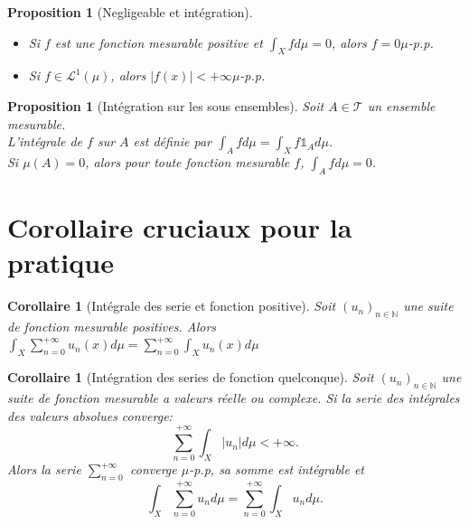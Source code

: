 \documentclass[a4paper,12pt,french]{report}
\theoremstyle{break}
\newtheorem{prop}[defin]{Proposition}
\newtheorem{coro}[defin]{Corollaire}
\begin{document}
\begin{prop}[Negligeable et intégration]
       \begin{itemize}
              \item Si $f$ est une fonction mesurable positive et $\int_{X} f d\mu = 0$, alors $f=0 \mu$-p.p.
              \item Si $f \in \mathcal{L}^{1}(\mu)$, alors $|f(x)| < +\infty \mu$-p.p.
       \end{itemize}
\end{prop}

\begin{prop}[Intégration sur les sous ensembles]
       Soit $A \in \mathcal{T}$ un ensemble mesurable.\\ L'intégrale de $f$ sur $A$ est définie par $\displaystyle \int_{A} f d\mu = \int_{X} f \mathds{1}_{A} d\mu$.\\ Si $\mu(A)=0$, alors pour toute fonction mesurable $f$, $\displaystyle \int_{A} f d\mu = 0$.
\end{prop}

\section{Corollaire cruciaux pour la pratique}
\begin{coro}[Intégrale des serie et fonction positive]
       Soit $(u_{n})_{n \in \mathbb{N}}$ une suite de fonction mesurable positives. Alors $\displaystyle \int_{X} \sum_{n=0}^{+\infty} u_{n} (x) d\mu = \sum_{n=0}^{+\infty} \int_{X} u_{n} (x) d\mu$
\end{coro}

\begin{coro}[Intégration des series de fonction quelconque]
       Soit $(u_{n})_{n \in \mathbb{N}}$ une suite de fonction mesurable a valeurs réelle ou complexe. Si la serie des intégrales des valeurs absolues converge: $$\sum_{n=0}^{+\infty} \int_{X} |u_{n}|d\mu < +\infty.$$
       Alors la serie $\displaystyle \sum_{n=0}^{+\infty}$ converge $\mu$-p.p, sa somme est intégrable et $$\int_{X} \sum_{n=0}^{+\infty} u_{n} d\mu = \sum_{n=0}^{+\infty} \int_{X} u_{n} d\mu.$$
\end{coro}
\end{document}
